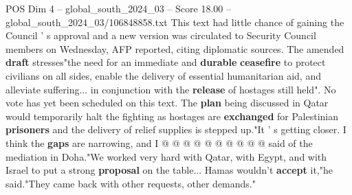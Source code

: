 \begin{textsample}{POS Dim 4 – global\_south\_2024\_03 – Score 18.00 – global\_south\_2024\_03/106848858.txt}
This text had little chance of gaining the Council ' s approval and a new version was circulated to Security Council members on Wednesday, AFP reported, citing diplomatic sources.
The amended \textbf{draft} stresses"the need for an immediate and \textbf{durable} \textbf{ceasefire} to protect civilians on all sides, enable the delivery of essential humanitarian aid, and alleviate suffering... in conjunction with the \textbf{release} of hostages still held".
No vote has yet been scheduled on this text.
The \textbf{plan} being discussed in Qatar would temporarily halt the fighting as hostages are \textbf{exchanged} for Palestinian \textbf{prisoners} and the delivery of relief supplies is stepped up."It ' s getting closer.
I think the \textbf{gaps} are narrowing, and I @ @ @ @ @ @ @ @ @ @ said of the mediation in Doha."We worked very hard with Qatar, with Egypt, and with Israel to put a strong \textbf{proposal} on the table...
Hamas wouldn't \textbf{accept} it,"he said."They came back with other requests, other demands."

\end{textsample}
